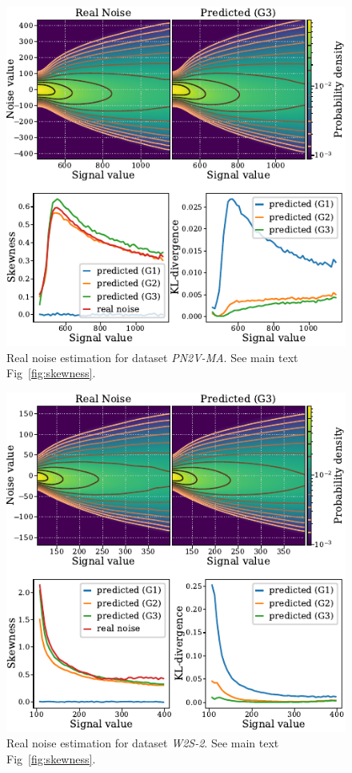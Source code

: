 \documentclass[lettersize,journal]{IEEEtran}
\begin{document}
\begin{figure}[ht]
\begin{center}
\centerline{\includegraphics[width=\columnwidth]{fig_skewness_pn2v-MA.pdf}}
\caption{Real noise estimation for dataset \textit{PN2V-MA}. See main text Fig~\ref{fig:skewness}.
}
\end{center}
\end{figure}

\begin{figure}[ht]
\begin{center}
\centerline{\includegraphics[width=\columnwidth]{fig_skewness_w2s-2.pdf}}
\caption{Real noise estimation for dataset \textit{W2S-2}. See main text Fig~\ref{fig:skewness}.
}
\end{center}
\end{figure}
\end{document}
